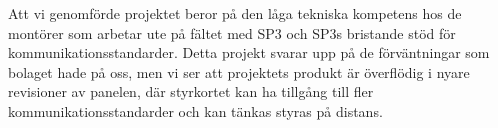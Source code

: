 \documentclass{article}
\begin{document}
		\noindent Att vi genomförde projektet beror på den låga tekniska kompetens hos de montörer som arbetar ute på fältet med SP3 och SP3s bristande stöd för kommunikationsstandarder. Detta projekt svarar upp på de förväntningar som bolaget hade på oss, men vi ser att projektets produkt är överflödig i nyare revisioner av panelen, där styrkortet kan ha tillgång till fler kommunikationsstandarder och kan tänkas styras på distans.


	\newpage\printbibliography		
\end{document}
